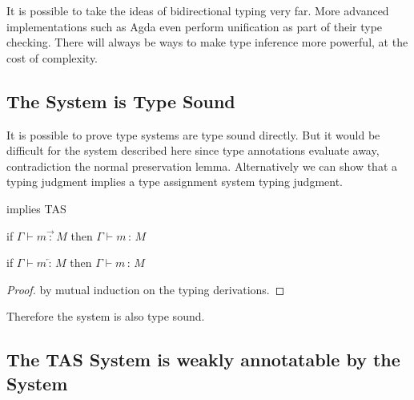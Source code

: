  
It is possible to take the ideas of bidirectional typing very far.
More advanced \bidir{} implementations such as Agda\cite{norell2007towards} even perform unification as part of their \bidir{} type checking.
There will always be ways to make type inference more powerful, at the cost of complexity.
 
\subsection{The \Bidir{} System is Type Sound}
 
It is possible to prove \bidir{} type systems are type sound directly\cite{nanevski2005dependent}.
But it would be difficult for the system described here since type annotations evaluate away, contradiction the normal preservation lemma.
Alternatively we can show that a \bidir{} typing judgment implies a type assignment system typing judgment.
 
\begin{thm}
\Bidir{} implies \ac{TAS}
 
if $\Gamma\vdash m\overrightarrow{\,:\,}M$ then $\Gamma\vdash m\,:\,M$
 
if $\Gamma\vdash m\overleftarrow{\,:\,}M$ then $\Gamma\vdash m\,:\,M$
\end{thm}
 
\begin{proof}
by mutual induction on the \bidir{} typing derivations.
\end{proof}
Therefore the \bidir{} system is also type sound.
 
\subsection{The \ac{TAS} System is weakly annotatable by the \Bidir{} System}
 
